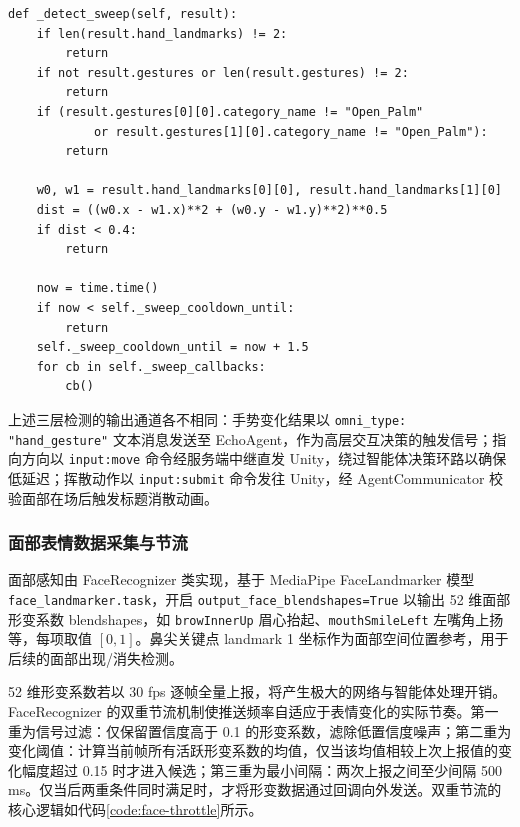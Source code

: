 \documentclass[bachelor]{njupthesis}
\begin{document}
\begin{code}
\caption{双手挥散检测：Open\_Palm + 距离阈值 + 冷却}
\label{code:sweep-detect}
\lstset{style=codeblock}
\begin{lstlisting}
def _detect_sweep(self, result):
    if len(result.hand_landmarks) != 2:
        return
    if not result.gestures or len(result.gestures) != 2:
        return
    if (result.gestures[0][0].category_name != "Open_Palm"
            or result.gestures[1][0].category_name != "Open_Palm"):
        return

    w0, w1 = result.hand_landmarks[0][0], result.hand_landmarks[1][0]
    dist = ((w0.x - w1.x)**2 + (w0.y - w1.y)**2)**0.5
    if dist < 0.4:
        return

    now = time.time()
    if now < self._sweep_cooldown_until:
        return
    self._sweep_cooldown_until = now + 1.5
    for cb in self._sweep_callbacks:
        cb()
\end{lstlisting}
\end{code}

上述三层检测的输出通道各不相同：手势变化结果以 \texttt{omni\_type: "hand\_gesture"} 文本消息发送至 EchoAgent，作为高层交互决策的触发信号；指向方向以 \texttt{input:move} 命令经服务端中继直发 Unity，绕过智能体决策环路以确保低延迟；挥散动作以 \texttt{input:submit} 命令发往 Unity，经 AgentCommunicator 校验面部在场后触发标题消散动画。

\subsubsection{面部表情数据采集与节流}

面部感知由 FaceRecognizer 类实现，基于 MediaPipe FaceLandmarker 模型 \texttt{face\_landmarker.task}，开启 \texttt{output\_face\_blendshapes=True} 以输出 52 维面部形变系数 blendshapes，如 \texttt{browInnerUp} 眉心抬起、\texttt{mouthSmileLeft} 左嘴角上扬等，每项取值 $[0, 1]$。鼻尖关键点 landmark 1 坐标作为面部空间位置参考，用于后续的面部出现/消失检测。

52 维形变系数若以 30 fps 逐帧全量上报，将产生极大的网络与智能体处理开销。FaceRecognizer 的双重节流机制使推送频率自适应于表情变化的实际节奏。第一重为信号过滤：仅保留置信度高于 0.1 的形变系数，滤除低置信度噪声；第二重为变化阈值：计算当前帧所有活跃形变系数的均值，仅当该均值相较上次上报值的变化幅度超过 0.15 时才进入候选；第三重为最小间隔：两次上报之间至少间隔 500 ms。仅当后两重条件同时满足时，才将形变数据通过回调向外发送。双重节流的核心逻辑如代码\ref{code:face-throttle}所示。
\end{document}
